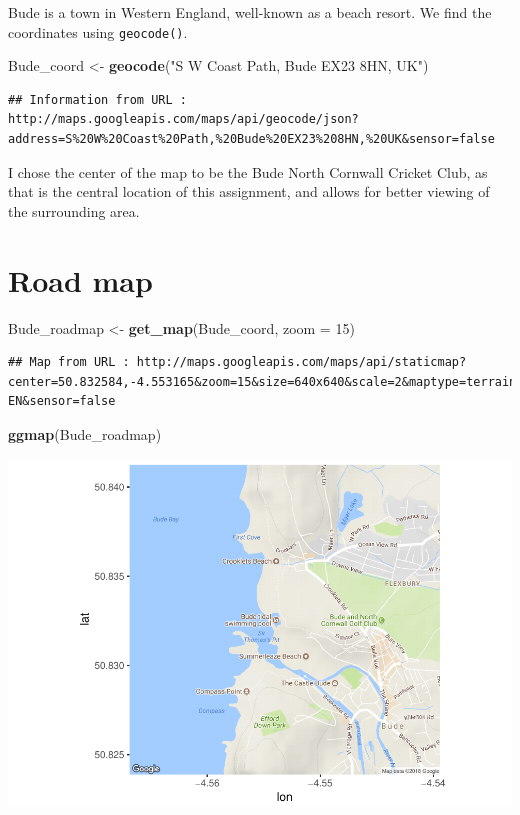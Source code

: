 \documentclass[]{article}
\newenvironment{Shaded}{\begin{snugshade}}{\end{snugshade}}
\newcommand{\DataTypeTok}[1]{\textcolor[rgb]{0.13,0.29,0.53}{#1}}
\newcommand{\DecValTok}[1]{\textcolor[rgb]{0.00,0.00,0.81}{#1}}
\newcommand{\KeywordTok}[1]{\textcolor[rgb]{0.13,0.29,0.53}{\textbf{#1}}}
\newcommand{\NormalTok}[1]{#1}
\newcommand{\StringTok}[1]{\textcolor[rgb]{0.31,0.60,0.02}{#1}}
\begin{document}
Bude is a town in Western England, well-known as a beach resort. We find
the coordinates using \texttt{geocode()}.

\begin{Shaded}
\begin{Highlighting}[]
\NormalTok{Bude_coord <-}\StringTok{ }\KeywordTok{geocode}\NormalTok{(}\StringTok{"S W Coast Path, Bude EX23 8HN, UK"}\NormalTok{) }
\end{Highlighting}
\end{Shaded}

\begin{verbatim}
## Information from URL : http://maps.googleapis.com/maps/api/geocode/json?address=S%20W%20Coast%20Path,%20Bude%20EX23%208HN,%20UK&sensor=false
\end{verbatim}

I chose the center of the map to be the Bude North Cornwall Cricket
Club, as that is the central location of this assignment, and allows for
better viewing of the surrounding area.

\hypertarget{road-map}{%
\section{Road map}\label{road-map}}

\begin{Shaded}
\begin{Highlighting}[]
\NormalTok{Bude_roadmap <-}\StringTok{ }\KeywordTok{get_map}\NormalTok{(Bude_coord, }\DataTypeTok{zoom =} \DecValTok{15}\NormalTok{)}
\end{Highlighting}
\end{Shaded}

\begin{verbatim}
## Map from URL : http://maps.googleapis.com/maps/api/staticmap?center=50.832584,-4.553165&zoom=15&size=640x640&scale=2&maptype=terrain&language=en-EN&sensor=false
\end{verbatim}

\begin{Shaded}
\begin{Highlighting}[]
\KeywordTok{ggmap}\NormalTok{(Bude_roadmap)}
\end{Highlighting}
\end{Shaded}

\includegraphics{Bude_files/figure-latex/unnamed-chunk-4-1.pdf}
\end{document}
